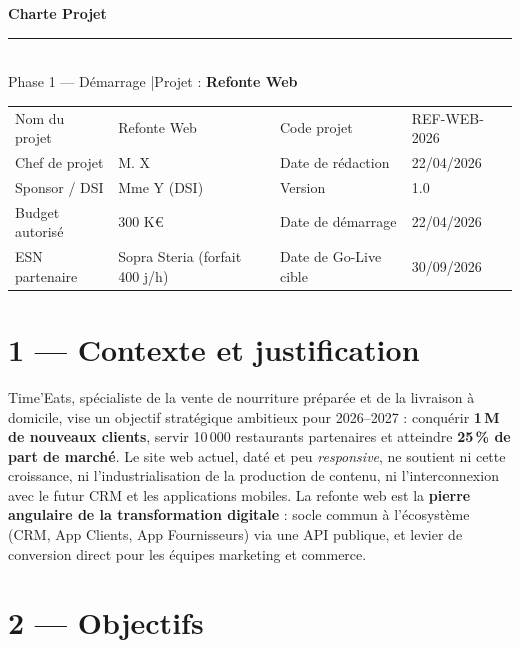 \documentclass[11pt,a4paper,oneside]{report}
\begin{document}
\small

\begin{center}
{\LARGE\bfseries\color{cnNavy} Charte Projet}\\[4pt]
\textcolor{cnOrange}{\rule{10cm}{1pt}}\\[4pt]
{\large\color{cnSlate} Phase 1 --- Démarrage \quad|\quad Projet : \textbf{Refonte Web}}
\end{center}

\vspace{6pt}
\renewcommand{\arraystretch}{1.4}
\begin{tabularx}{\textwidth}{L{4cm} Y L{4cm} Y}
\toprule
{} &  &  &  \\
\midrule
Nom du projet      & Refonte Web                & Code projet       & REF-WEB-2026 \\
Chef de projet     & M. X           & Date de rédaction & 22/04/2026 \\
Sponsor / DSI      & Mme Y (DSI)        & Version           & 1.0 \\
Budget autorisé    & 300 K€                     & Date de démarrage & 22/04/2026 \\
ESN partenaire     & Sopra Steria (forfait 400 j/h) & Date de Go-Live cible & 30/09/2026 \\
\bottomrule
\end{tabularx}

\section*{1 --- Contexte et justification}

Time'Eats, spécialiste de la vente de nourriture préparée et de la livraison à domicile, vise un objectif stratégique ambitieux pour 2026--2027 : conquérir \textbf{1\,M de nouveaux clients}, servir 10\,000 restaurants partenaires et atteindre \textbf{25\,\% de part de marché}. Le site web actuel, daté et peu \emph{responsive}, ne soutient ni cette croissance, ni l'industrialisation de la production de contenu, ni l'interconnexion avec le futur CRM et les applications mobiles. La refonte web est la \textbf{pierre angulaire de la transformation digitale} : socle commun à l'écosystème (CRM, App Clients, App Fournisseurs) via une API publique, et levier de conversion direct pour les équipes marketing et commerce.

\section*{2 --- Objectifs}
\end{document}
